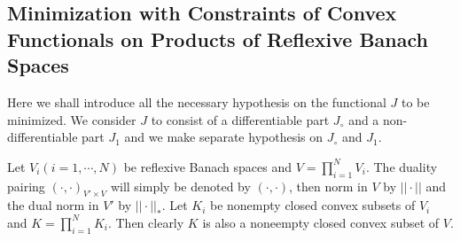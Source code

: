 \subsection{Minimization with Constraints of Convex Functionals on Products of Reflexive Banach Spaces}\label{chap4-subsec4.2}
Here we shall introduce all the necessary hypothesis on the functional $J$ to be minimized. We consider $J$ to consist of a differentiable part $J_{\circ}$ and a non-differentiable part $J_{1}$ and we make separate hypothesis on $J_{\circ}$ and $J_{1}$.

Let $V_{i}(i = 1, \cdots, N)$ be reflexive Banach spaces and $V = \prod_{i=1}^{N} V_{i}$. The duality pairing $(\cdot ,  \cdot)_{V' \times V}$ will simply be denoted by $(\cdot , \cdot)$, then norm in $V$ by $|| \cdot ||$ and the dual norm in $V'$ by $|| \cdot ||_{*}$. Let $K_{i}$ be nonempty closed convex subsets of $V_{i}$ and $K = \prod_{i=1}^{N} K_{i}$. Then clearly $K$ is also a noneempty closed convex subset of $V$.

